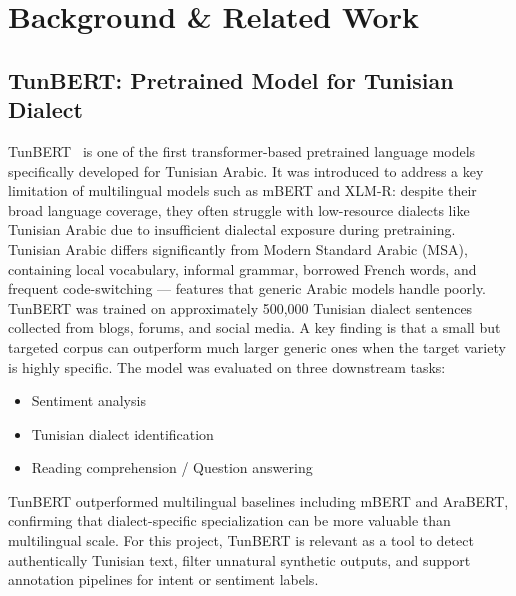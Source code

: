 \documentclass[12pt,a4paper]{report}
\begin{document}
\chapter{Background \& Related Work}
\section{TunBERT: Pretrained Model for Tunisian Dialect}
TunBERT~\citep{messaoudi2021tunbertpretrainedcontextualizedtext} is one of the first transformer-based pretrained language models specifically developed for Tunisian Arabic. It was introduced to address a key limitation of multilingual models such as mBERT and XLM-R: despite their broad language coverage, they often struggle with low-resource dialects like Tunisian Arabic due to insufficient dialectal exposure during pretraining.
Tunisian Arabic differs significantly from Modern Standard Arabic (MSA), containing local vocabulary, informal grammar, borrowed French words, and frequent code-switching — features that generic Arabic models handle poorly.
TunBERT was trained on approximately 500,000 Tunisian dialect sentences collected from blogs, forums, and social media. A key finding is that a small but targeted corpus can outperform much larger generic ones when the target variety is highly specific.
The model was evaluated on three downstream tasks:
\begin{itemize}
\item Sentiment analysis
\item Tunisian dialect identification
\item Reading comprehension / Question answering
\end{itemize}
TunBERT outperformed multilingual baselines including mBERT and AraBERT, confirming that dialect-specific specialization can be more valuable than multilingual scale.
For this project, TunBERT is relevant as a tool to detect authentically Tunisian text, filter unnatural synthetic outputs, and support annotation pipelines for intent or sentiment labels.
\end{document}
